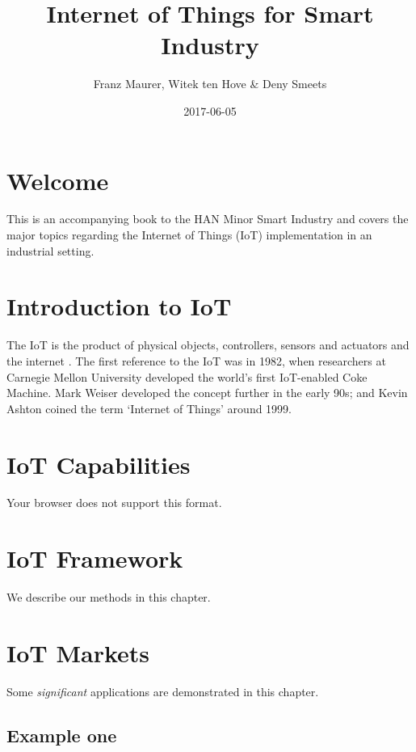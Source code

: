 \documentclass[]{book}
\title{Internet of Things for Smart Industry}
\author{Franz Maurer, Witek ten Hove \& Deny Smeets}
\date{2017-06-05}
\theoremstyle{definition}
\theoremstyle{definition}
\theoremstyle{remark}
\begin{document}
\maketitle

{
\setcounter{tocdepth}{1}
\tableofcontents
}
\chapter{Welcome}\label{welcome}

This is an accompanying book to the HAN Minor Smart Industry and covers
the major topics regarding the Internet of Things (IoT) implementation
in an industrial setting.

\chapter{Introduction to IoT}\label{intro}

The IoT is the product of physical objects, controllers, sensors and
actuators and the internet \citep{mcewen_designing_2013}. The first
reference to the IoT was in 1982, when researchers at Carnegie Mellon
University developed the world's first IoT-enabled Coke Machine. Mark
Weiser developed the concept further in the early 90s; and Kevin Ashton
coined the term `Internet of Things' around 1999.

\chapter{IoT Capabilities}\label{capabilities}

 Your browser does not support this format.

\chapter{IoT Framework}\label{framework}

We describe our methods in this chapter.

\chapter{IoT Markets}\label{markets}

Some \emph{significant} applications are demonstrated in this chapter.

\section{Example one}\label{example-one}
\end{document}
